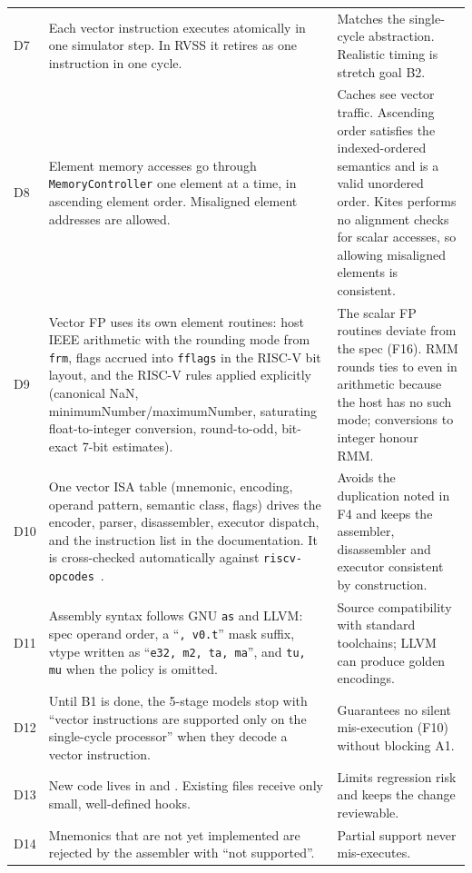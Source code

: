 \documentclass[11pt]{article}
\begin{document}
\begin{longtable}{@{}L{0.8cm}L{6.4cm}L{7.9cm}@{}}
D7 & Each vector instruction executes atomically in one simulator step. In RVSS it retires as one instruction in one cycle. & Matches the single-cycle abstraction. Realistic timing is stretch goal B2. \\
D8 & Element memory accesses go through \texttt{MemoryController} one element at a time, in ascending element order. Misaligned element addresses are allowed. & Caches see vector traffic. Ascending order satisfies the indexed-ordered semantics and is a valid unordered order. Kites performs no alignment checks for scalar accesses, so allowing misaligned elements is consistent. \\
D9 & Vector FP uses its own element routines: host IEEE arithmetic with the rounding mode from \texttt{frm}, flags accrued into \texttt{fflags} in the RISC-V bit layout, and the RISC-V rules applied explicitly (canonical NaN, minimumNumber/maximumNumber, saturating float-to-integer conversion, round-to-odd, bit-exact 7-bit estimates). & The scalar FP routines deviate from the spec (F16). RMM rounds ties to even in arithmetic because the host has no such mode; conversions to integer honour RMM. \\
D10 & One vector ISA table (mnemonic, encoding, operand pattern, semantic class, flags) drives the encoder, parser, disassembler, executor dispatch,  and the instruction list in the documentation. It is cross-checked automatically against \texttt{riscv-opcodes}~\cite{opcodes}. & Avoids the duplication noted in F4 and keeps the assembler, disassembler and executor consistent by construction. \\
D11 & Assembly syntax follows GNU \texttt{as} and LLVM: spec operand order, a ``\texttt{, v0.t}'' mask suffix, vtype written as ``\texttt{e32, m2, ta, ma}'', and \texttt{tu, mu} when the policy is omitted. & Source compatibility with standard toolchains; LLVM can produce golden encodings. \\
D12 & Until B1 is done, the 5-stage models stop with ``vector instructions are supported only on the single-cycle processor'' when they decode a vector instruction. & Guarantees no silent mis-execution (F10) without blocking A1. \\
D13 & New code lives in  and . Existing files receive only small, well-defined hooks. & Limits regression risk and keeps the change reviewable. \\
D14 & Mnemonics that are not yet implemented are rejected by the assembler with ``not supported''. & Partial support never mis-executes. \\
\bottomrule
\end{longtable}
\normalsize
\end{document}
